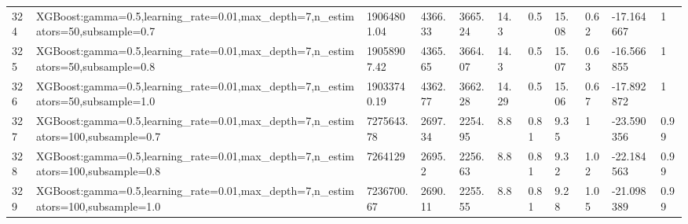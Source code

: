 \begin{longtable}{C{0.8cm} L{2cm} C{1.15cm} C{1.15cm} C{1.15cm} C{1.15cm} C{0.85cm} C{1.25cm} C{1.2cm} C{1.5cm} C{1.0cm}}
324 & XGBoost:\newline gamma=0.5,\newline learning\_rate=0.01,\newline max\_depth=7,\newline n\_estimators=50,\newline subsample=0.7 & 19064801.04 & 4366.33 & 3665.24 & 14.3 & 0.5 & 15.08 & 0.62 & -17.164667 & 1 \\
325 & XGBoost:\newline gamma=0.5,\newline learning\_rate=0.01,\newline max\_depth=7,\newline n\_estimators=50,\newline subsample=0.8 & 19058907.42 & 4365.65 & 3664.07 & 14.3 & 0.5 & 15.07 & 0.63 & -16.566855 & 1 \\
326 & XGBoost:\newline gamma=0.5,\newline learning\_rate=0.01,\newline max\_depth=7,\newline n\_estimators=50,\newline subsample=1.0 & 19033740.19 & 4362.77 & 3662.28 & 14.29 & 0.5 & 15.06 & 0.67 & -17.892872 & 1 \\
327 & XGBoost:\newline gamma=0.5,\newline learning\_rate=0.01,\newline max\_depth=7,\newline n\_estimators=100,\newline subsample=0.7 & 7275643.78 & 2697.34 & 2254.95 & 8.8 & 0.81 & 9.35 & 1 & -23.590356 & 0.99 \\
328 & XGBoost:\newline gamma=0.5,\newline learning\_rate=0.01,\newline max\_depth=7,\newline n\_estimators=100,\newline subsample=0.8 & 7264129 & 2695.2 & 2256.63 & 8.8 & 0.81 & 9.32 & 1.02 & -22.184563 & 0.99 \\
329 & XGBoost:\newline gamma=0.5,\newline learning\_rate=0.01,\newline max\_depth=7,\newline n\_estimators=100,\newline subsample=1.0 & 7236700.67 & 2690.11 & 2255.55 & 8.8 & 0.81 & 9.28 & 1.05 & -21.098389 & 0.99 \\

\end{longtable}
